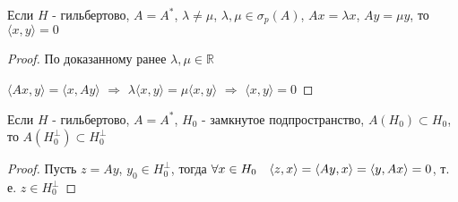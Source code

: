 \documentclass[a4paper,12pt]{report}
\newcommand*{\hm}[1]{#1\nobreak\discretionary{}%
            {\hbox{$\mathsurround=0pt #1$}}{}}
\begin{document}
\begin{lem}
Если $H$ - гильбертово, $A=A^*$, $\lambda\ne\mu$, $\lambda,\mu\in\sigma_p(A)$, $Ax=\lambda x$, $Ay=\mu y$, то $\langle x,y\rangle=0$
\end{lem}
\begin{proof}
По доказанному ранее $\lambda,\mu\in\mathbb R$

$\langle Ax,y\rangle=\langle x,Ay\rangle$ $\Rightarrow$ $\lambda\langle x,y\rangle=\mu\langle x,y\rangle$ $\Rightarrow$ $\langle x,y\rangle=0$
\end{proof}
 


\begin{lem}
Если $H$ - гильбертово, $A=A^*$, $H_0$ - замкнутое подпространство, $A(H_0)\subset H_0$, то $A(H_0^\perp)\subset H_0^\perp$
\end{lem}
\begin{proof}
Пусть $z=Ay$, $y_0\in H_0^\perp$, тогда $\forall x\in H_0\quad\langle z,x\rangle=\langle Ay,x\rangle\hm=\langle y,Ax\rangle=0$, т. е. $z\in H_0^\perp$
\end{proof}
 
\end{document}
